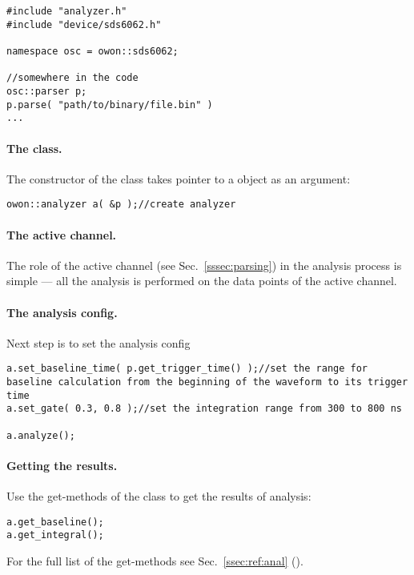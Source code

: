 \begin{lstlisting}
#include "analyzer.h"
#include "device/sds6062.h"

namespace osc = owon::sds6062;

//somewhere in the code
osc::parser p;
p.parse( "path/to/binary/file.bin" )
...
\end{lstlisting}

\paragraph*{The  class.} The constructor of the  class
takes pointer to a  object as an argument:
\begin{lstlisting}
owon::analyzer a( &p );//create analyzer
\end{lstlisting}

\paragraph*{The active channel.} The role of the active channel (see Sec.~\ref{sssec:parsing})
in the analysis process is simple --- all the analysis is performed on the data points
of the active channel.

\paragraph*{The analysis config.} Next step is to set the analysis config

\begin{lstlisting}
a.set_baseline_time( p.get_trigger_time() );//set the range for baseline calculation from the beginning of the waveform to its trigger time
a.set_gate( 0.3, 0.8 );//set the integration range from 300 to 800 ns

a.analyze();
\end{lstlisting}

\paragraph*{Getting the results.} Use the get-methods of the  class to
get the results of analysis:
\begin{lstlisting}
a.get_baseline();
a.get_integral();
\end{lstlisting}
For the full list of the get-methods see Sec.~\ref{ssec:ref:anal} ().

\newpage

